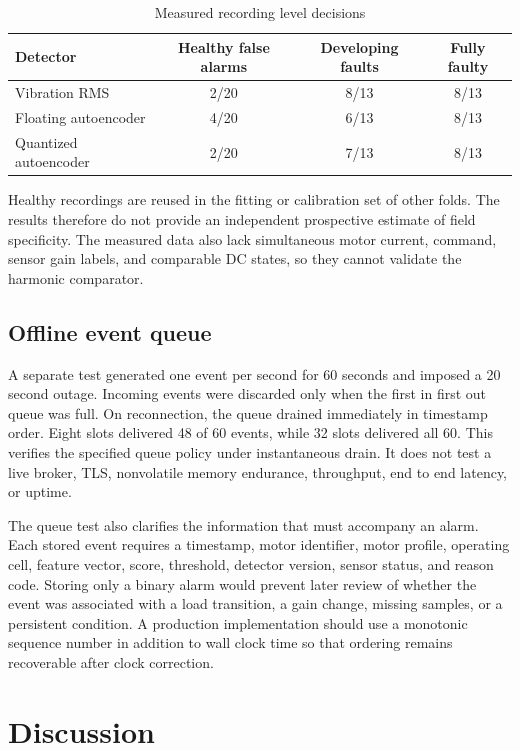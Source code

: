\documentclass[10pt,twocolumn]{article}
\begin{document}
\begin{table}[t]
\caption{Measured recording level decisions}
\label{tab:ottawa}
\centering
\scriptsize
\begin{tabularx}{\columnwidth}{@{}Xccc@{}}
\toprule
Detector & Healthy false alarms & Developing faults & Fully faulty \\
\midrule
Vibration RMS & 2/20 & 8/13 & 8/13 \\
Floating autoencoder & 4/20 & 6/13 & 8/13 \\
Quantized autoencoder & 2/20 & 7/13 & 8/13 \\
\bottomrule
\end{tabularx}
\end{table}

Healthy recordings are reused in the fitting or calibration set of other folds. The results therefore do not provide an independent prospective estimate of field specificity. The measured data also lack simultaneous motor current, command, sensor gain labels, and comparable DC states, so they cannot validate the harmonic comparator.

\subsection{Offline event queue}
A separate test generated one event per second for 60 seconds and imposed a 20 second outage. Incoming events were discarded only when the first in first out queue was full. On reconnection, the queue drained immediately in timestamp order. Eight slots delivered 48 of 60 events, while 32 slots delivered all 60. This verifies the specified queue policy under instantaneous drain. It does not test a live broker, TLS, nonvolatile memory endurance, throughput, end to end latency, or uptime.

The queue test also clarifies the information that must accompany an alarm. Each stored event requires a timestamp, motor identifier, motor profile, operating cell, feature vector, score, threshold, detector version, sensor status, and reason code. Storing only a binary alarm would prevent later review of whether the event was associated with a load transition, a gain change, missing samples, or a persistent condition. A production implementation should use a monotonic sequence number in addition to wall clock time so that ordering remains recoverable after clock correction.

\section{Discussion}
\end{document}
